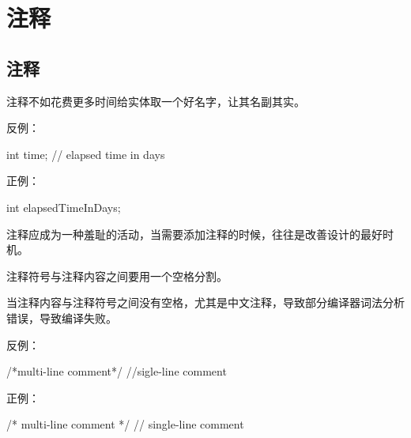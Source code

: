\begin{savequote}[45mm]
\end{savequote}

\chapter{注释} 
\label{ch:comment}

\section{注释}
\begin{content}

\begin{regulation}
注释不如花费更多时间给实体取一个好名字，让其名副其实。
\end{regulation}

反例：
\begin{leftbar}
\begin{c++}
int time; // elapsed time in days
\end{c++}
\end{leftbar}

正例：
\begin{leftbar}
\begin{c++}
int elapsedTimeInDays;
\end{c++}
\end{leftbar}

注释应成为一种羞耻的活动，当需要添加注释的时候，往往是改善设计的最好时机。

\begin{regulation}
注释符号与注释内容之间要用一个空格分割。
\end{regulation}

当注释内容与注释符号之间没有空格，尤其是中文注释，导致部分编译器词法分析错误，导致编译失败。

反例：
\begin{leftbar}
\begin{c++}
/*multi-line comment*/
//sigle-line comment
\end{c++}
\end{leftbar}

正例：
\begin{leftbar}
\begin{c++}
/* multi-line comment */
// single-line comment
\end{c++}
\end{leftbar}


\end{content}
